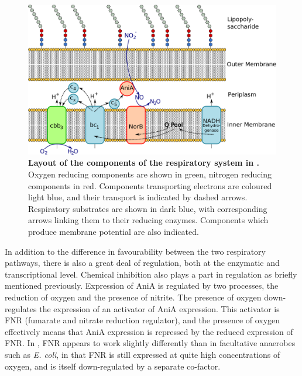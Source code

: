 \begin{figure}[tbp]
 \begin{center}
 \includegraphics[width=14cm]{./01-introduction/data/Respiratory_layout.pdf}
\end{center}
\caption[{Layout of the components of the respiratory system in \Nsm{}.}]{{\bf Layout of the components of the respiratory system in \Nsm{}.} Oxygen reducing components are shown in green, nitrogen reducing components in red. Components transporting electrons are coloured light blue, and their transport is indicated by dashed arrows. Respiratory substrates are shown in dark blue, with corresponding arrows linking them to their reducing enzymes. Components which produce membrane potential are also indicated.
\label{fig:etc}}
\end{figure}

In addition to the difference in favourability between the two respiratory pathways, there is also a great deal of regulation, both at the enzymatic and transcriptional level. Chemical inhibition also plays a part in regulation as briefly mentioned previously. Expression of AniA is regulated by two processes, the reduction of oxygen and the presence of nitrite. The presence of oxygen down-regulates the expression of an activator of AniA expression. This activator is FNR (fumarate and nitrate reduction regulator), and the presence of oxygen effectively means that AniA expression is repressed by the reduced expression of FNR. In \Nm{}, FNR appears to work slightly differently than in facultative anaerobes such as \textit{E. coli}, in that FNR is still expressed at quite high concentrations of oxygen, and is itself down-regulated by a separate co-factor\cite{Rock2007}.

